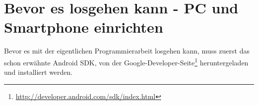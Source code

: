 \section{Bevor es losgehen kann - PC und Smartphone einrichten}
Bevor es mit der eigentlichen Programmierarbeit losgehen kann, muss zuerst das schon erw\"ahnte Android \ac{SDK}, von der Google-Developer-Seite\footnote{\url{http://developer.android.com/sdk/index.html}} heruntergeladen und installiert werden.